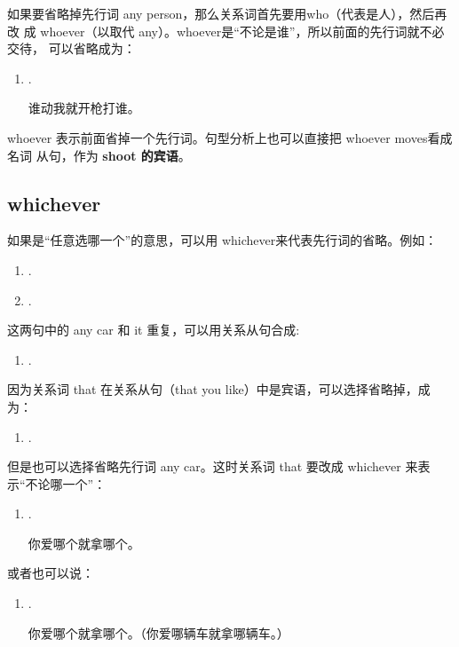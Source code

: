 如果要省略掉先行词 any person，那么关系词首先要用who（代表是人），然后再改
成 whoever（以取代 any）。whoever是“不论是谁”，所以前面的先行词就不必交待，
可以省略成为：
\begin{enumerate}[resume]
\item {}  .

  谁动我就开枪打谁。
\end{enumerate}
whoever 表示前面省掉一个先行词。句型分析上也可以直接把 whoever moves看成名词
从句，作为 \textbf{shoot 的宾语}。

\subsection{whichever}

如果是“任意选哪一个”的意思，可以用 whichever来代表先行词的省略。例如：

\begin{enumerate}
\item {}  .
\item {}  .
\end{enumerate}
这两句中的 any car 和 it 重复，可以用关系从句合成:
\begin{enumerate}[resume]
\item {}     .
\end{enumerate}
因为关系词 that 在关系从句（that you like）中是宾语，可以选择省略掉，成为：
\begin{enumerate}[resume]
\item {}   
  .
\end{enumerate}
但是也可以选择省略先行词 any car。这时关系词 that 要改成 whichever
来表示“不论哪一个”：
\begin{enumerate}[resume]
\item {}   
  .

  你爱哪个就拿哪个。
\end{enumerate}
或者也可以说：
\begin{enumerate}[resume]
\item {}   
  .

你爱哪个就拿哪个。（你爱哪辆车就拿哪辆车。）
\end{enumerate}

